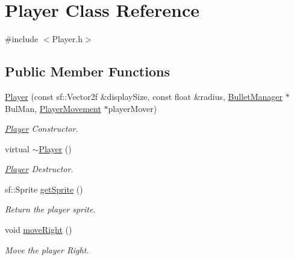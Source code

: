 \hypertarget{class_player}{}\section{Player Class Reference}
\label{class_player}


{\ttfamily \#include $<$Player.\+h$>$}

\subsection*{Public Member Functions}
\begin{DoxyCompactItemize}
\item 
\hyperlink{class_player_a73caf03d79f04f53fe9d799bb5123c37}{Player} (const sf\+::\+Vector2f \&display\+Size, const float \&radius, \hyperlink{class_bullet_manager}{Bullet\+Manager} $\ast$Bul\+Man, \hyperlink{class_player_movement}{Player\+Movement} $\ast$player\+Mover)
\begin{DoxyCompactList}\small\item\em \hyperlink{class_player}{Player} Constructor. \end{DoxyCompactList}\item 
\mbox{\label{class_player_a749d2c00e1fe0f5c2746f7505a58c062}} 
virtual \hyperlink{class_player_a749d2c00e1fe0f5c2746f7505a58c062}{$\sim$\+Player} ()
\begin{DoxyCompactList}\small\item\em \hyperlink{class_player}{Player} Destructor. \end{DoxyCompactList}\item 
\mbox{\label{class_player_aabef659f696be314cdb705a1ce77ec2a}} 
sf\+::\+Sprite \hyperlink{class_player_aabef659f696be314cdb705a1ce77ec2a}{get\+Sprite} ()
\begin{DoxyCompactList}\small\item\em Return the player sprite. \end{DoxyCompactList}\item 
\mbox{\label{class_player_a6a2b68bc4b21d4c4a79a23b498896ec2}} 
void \hyperlink{class_player_a6a2b68bc4b21d4c4a79a23b498896ec2}{move\+Right} ()
\begin{DoxyCompactList}\small\item\em Move the player Right. \end{DoxyCompactList}\item 

\end{DoxyCompactItemize}
